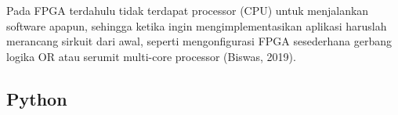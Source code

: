 Pada FPGA terdahulu tidak terdapat processor (CPU) untuk menjalankan software apapun, sehingga ketika ingin mengimplementasikan aplikasi haruslah merancang sirkuit dari awal, seperti mengonfigurasi FPGA sesederhana gerbang logika OR atau serumit multi-core processor (Biswas, 2019). 


\subsection{Python}




